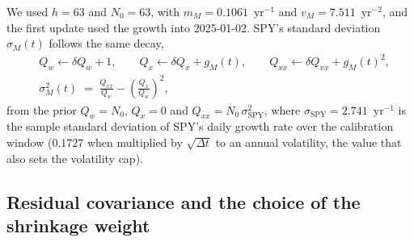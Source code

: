 We used $h = 63$ and $N_0 = 63$, with $m_M = 0.1061$~$\mathrm{yr}^{-1}$ and $v_M = 7.511$~$\mathrm{yr}^{-2}$, and
the first update used the growth into 2025-01-02. SPY's standard deviation $\sigma_M(t)$ follows the same decay,
\begin{equation}
  \begin{aligned}
    &Q_w \leftarrow \delta Q_w + 1, \qquad Q_x \leftarrow \delta Q_x + g_M(t), \qquad
    Q_{xx} \leftarrow \delta Q_{xx} + g_M(t)^2,\\
    &\sigma_M^2(t) \;=\; \frac{Q_{xx}}{Q_w} - \left(\frac{Q_x}{Q_w}\right)^2,
  \end{aligned}
  \label{eq:ewvar}
\end{equation}
from the prior $Q_w = N_0$, $Q_x = 0$ and $Q_{xx} = N_0\,\sigma_{\mathrm{SPY}}^2$, where $\sigma_{\mathrm{SPY}} = 2.741$~$\mathrm{yr}^{-1}$ is
the sample standard deviation of SPY's daily growth rate over the calibration window ($0.1727$ when multiplied by
$\sqrt{\Delta t}$ to an annual volatility, the value that also sets the volatility cap).

\subsection{Residual covariance and the choice of the shrinkage weight}

